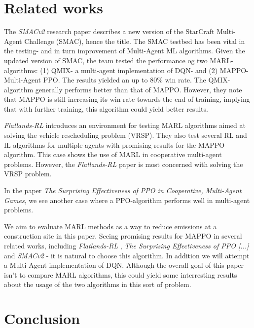 \documentclass[conference]{IEEEtran}
\begin{document}
\noindent


\section{Related works}
The \textit{SMACv2} \cite{ellis2022smacv2} research paper describes a new version of the StarCraft Multi-Agent
Challenge (SMAC), hence the title. The SMAC testbed has been vital in the testing- and in turn improvement
of Multi-Agent ML algorithms. Given the updated version of SMAC, the team tested the performance og two
MARL- algorithms: (1) QMIX- a multi-agent implementation of DQN- and (2) MAPPO- Multi-Agent PPO. The
results yielded an up to 80\% win rate. The QMIX-algorithm generally performs better than that of MAPPO.
However, they note that MAPPO is still increasing its win rate towards the end of training, implying
that with further training, this algorithm could yield better results.

\textit{Flatlands-RL} \cite{laurent2021flatland} introduces an environment for testing MARL algorithms aimed at
solving the vehicle rescheduling problem (VRSP). They also test several RL and IL algorithms for
multiple agents with promising results for the MAPPO algorithm. This case shows the use of MARL in cooperative
multi-agent problems. However, the \textit{Flatlands-RL} paper is most concerned with solving the VRSP problem.

In the paper \textit{The Surprising Effectiveness of PPO in Cooperative, Multi-Agent Games}, \cite{yu2022surprising}
we see another case where a PPO-algorithm performs well in multi-agent problems.

We aim to evaluate MARL methods as a way to reduce \coo emissions at a construction site in this paper.
Seeing promising results for MAPPO in several related works, including \textit{Flatlands-RL} \cite{laurent2021flatland},
\textit{The Surprising Effectiveness of PPO [...]} \cite{yu2022surprising} and \textit{SMACv2} \cite{ellis2022smacv2}-
it is natural to choose this algorithm. In addition we will attempt a Multi-Agent implementation of DQN. Although the
overall goal of this paper isn't to compare MARL algorithms, this could yield some interresting results about the
usage of the two algorithms in this sort of problem.


\section{Conclusion}
\end{document}
